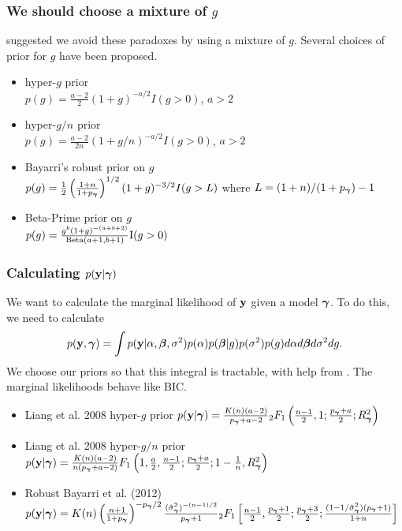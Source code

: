 \documentclass{beamer}
\begin{document}
\begin{frame}
	\frametitle{We should choose a mixture of $g$}
	\citep{Liang2008} suggested we avoid these paradoxes by using a mixture of $g$. Several choices of prior
	for $g$	have been proposed.
	\small
	\begin{itemize}
		\item hyper-$g$ prior \\
		$p(g) = \frac{a-2}{2} (1 + g)^{-a/2} I(g > 0)$, $a > 2$ \citep{Liang2008}
		\item hyper-$g/n$ prior \\
		$p(g) = \frac{a-2}{2n} (1 + g/n)^{-a/2} I(g > 0)$, $a > 2$ \citep{Liang2008}
		\item Bayarri's robust prior on $g$ \\
		$p(g) = \frac{1}{2} \left(  \frac{1 + n}{1 + p_{\boldsymbol \gamma}} \right)^{1/2} (1 + g)^{-3/2} I(g > L)$
		where $L = (1 + n)/(1 + p_{\boldsymbol \gamma}) - 1$
		\citep{Bayarri2012}
		\item Beta-Prime prior on $g$ \\
		$p(g) = \frac{g^b (1 + g)^{-(a + b + 2)}}{\text{Beta}(a + 1, b + 1)} \text{I}(g > 0)$
		\citep{Maruyama2011}
	\end{itemize}
\end{frame}

\begin{frame}
	\frametitle{Calculating $p({\bf y} | {\boldsymbol \gamma})$}
	We want to calculate the marginal likelihood of ${\bf y}$ given a model ${\boldsymbol \gamma}$.
	To do this, we need to calculate
	$$p({\bf y}, {\boldsymbol \gamma}) = \int p({\bf y} | \alpha, {\boldsymbol \beta}, \sigma^2) p(\alpha) p({\boldsymbol \beta} | g) p(\sigma^2) p(g) d \alpha d {\boldsymbol \beta} d \sigma^2 d g.$$
	We choose our priors so that this integral is tractable, with help from \citep{Gradshteyn1988}.
	The marginal likelihoods behave like BIC.
	\small
	\begin{itemize}
		\item Liang et al. 2008 hyper-$g$ prior \citep{Liang2008}
			$p({\bf y} | {\boldsymbol \gamma}) = \frac{K(n) (a - 2)}{p_{\boldsymbol \gamma} + a  - 2} {}_2 F_1 \left( \frac{n-1}{2}, 1; \frac{p_{\boldsymbol \gamma} + a}{2}; R_{\boldsymbol \gamma}^2 \right)$
		\item Liang et al. 2008 hyper-$g/n$ prior \citep{Liang2008}
			$p({\bf y} | {\boldsymbol \gamma}) = \frac{K(n) (a - 2)}{n (p_{\boldsymbol \gamma} + a  - 2)} F_1 \left( 1, \frac{a}{2}, \frac{n-1}{2}; \frac{p_{\boldsymbol \gamma} + a}{2}; 1 - \frac{1}{n}, R_{\boldsymbol \gamma}^2 \right)$
		\item Robust Bayarri et al. (2012) \citep{Bayarri2012} 
			\tiny
			$p({\bf y} | {\boldsymbol \gamma}) = K(n) \left(\frac{n + 1}{1 + p_{\boldsymbol \gamma}}\right)^{-p_{\boldsymbol \gamma}/2} \frac{(\hat{\sigma}_{\boldsymbol \gamma}^2)^{-(n-1)/2}}{p_{\boldsymbol \gamma} + 1} {}_2 F_1 \left[ \frac{n-1}{2}, \frac{p_{\boldsymbol \gamma}+1}{2}; \frac{p_{\boldsymbol \gamma} + 3}{2}; \frac{(1 - 1/\hat{\sigma}_{\boldsymbol \gamma}^2)(p_{\boldsymbol \gamma} + 1)}{1 + n} \right]$
	\end{itemize}
\end{frame}
\end{document}
